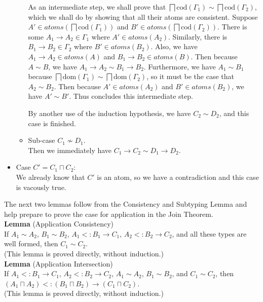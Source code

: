 \documentclass{article}
\newcommand{\ATOMS}[1]{\mathit{atoms}(#1)}
\begin{document}
\begin{itemize}
\begin{itemize}
    As an intermediate step, we shall prove that
    $\bigsqcap \mathrm{cod}(\Gamma_1) \sim \bigsqcap \mathrm{cod}(\Gamma_2)$,
    which we shall do by showing that all their atoms are consistent.
    Suppose $A' \in \ATOMS{\bigsqcap \mathrm{cod}(\Gamma_1)}$
    and $B' \in \ATOMS{\bigsqcap \mathrm{cod}(\Gamma_2)}$.
    There is some $A_1\to A_2 \in \Gamma_1$ where $A' \in \ATOMS{A_2}$.
    Similarly, there is $B_1 \to B_2 \in \Gamma_2$ where $B' \in \ATOMS{B_2}$.
    Also, we have $A_1 \to A_2 \in \ATOMS{A}$ and $B_1 \to B_2 \in \ATOMS{B}$.
    Then because $A \sim B$, we have $A_1 \to A_2 \sim B_1 \to B_2$.
    Furthermore, we have $A_1 \sim B_1$ because
    $\bigsqcap \mathrm{dom}(\Gamma_1) \sim \bigsqcap \mathrm{dom}(\Gamma_2)$,
    so it must be the case that $A_2 \sim B_2$.
    Then because $A' \in \ATOMS{A_2}$ and $B' \in \ATOMS{B_2}$, we
    have $A' \sim B'$. Thus concludes this intermediate step.

    By another use of the induction hypothesis, we have
    $C_2 \sim D_2$, and this case is finished.
    
  \item Sub-case $C_1 \not\sim D_1$.\\
    Then we immediately have $C_1 \to C_2 \sim D_1 \to D_2$.
  \end{itemize}
  
\item Case $C'=C_1\sqcap C_2$:\\
  We already know that $C'$ is an atom, so we have a contradiction
  and this case is vacously true.
\end{itemize}

The next two lemmas follow from the Consistency and Subtyping Lemma
and help prepare to prove the case for application in the Join
Theorem. \\

\noindent \textbf{Lemma} (Application Consistency) \\
%
If $A_1 \sim A_2$, $B_1 \sim B_2$, $A_1 <: B_1 \to C_1$,
$A_2 <: B_2 \to C_2$, and all these types are well formed,
then $C_1 \sim C_2$.\\
(This lemma is proved directly, without induction.)\\

\noindent \textbf{Lemma} (Application Intersection) \\
%
If $A_1 <: B_1 \to C_1$, $A_2 <: B_2 \to C_2$, $A_1 \sim A_2$,
$B_1 \sim B_2$, and $C_1 \sim C_2$, then
$(A_1\sqcap A_2) <: (B_1 \sqcap B_2) \to (C_1 \sqcap C_2)$.\\
(This lemma is proved directly, without induction.) \\
\end{document}
